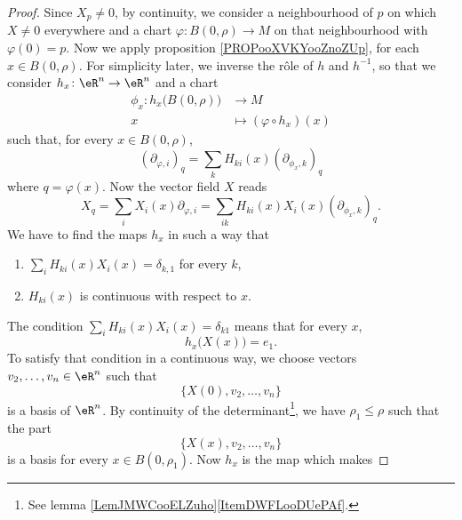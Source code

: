 \begin{proof}
	Since \( X_p\neq 0\), by continuity, we consider a neighbourhood of \( p\) on which \( X\neq 0\) everywhere and a chart \(\varphi \colon B(0,\rho)\to M  \) on that neighbourhood with \( \varphi(0)=p\). Now we apply proposition \ref{PROPooXVKYooZnoZUp}, for each \( x\in B(0,\rho)\). For simplicity later, we inverse the rôle of \( h\) and \( h^{-1}\), so that we consider \(h_x \colon \eR^n\to \eR^n  \) and a chart
	\begin{equation}
		\begin{aligned}
			\phi_x\colon h_x\big( B(0,\rho) \big) & \to M                         \\
			x                                     & \mapsto (\varphi\circ h_x)(x)
		\end{aligned}
	\end{equation}
	such that, for every \( x\in B(0,\rho)\),
	\begin{equation}
		(\partial_{\varphi, i})_q=\sum_kH_{ki}(x)(\partial_{\phi_x,k})_q
	\end{equation}
	where \( q=\varphi(x)\). Now the vector field \( X\) reads
	\begin{equation}
		X_q=\sum_iX_i(x)\partial_{\varphi,i}=\sum_{ik}H_{ki}(x)X_i(x)(\partial_{\phi_x,k})_q.
	\end{equation}
	We have to find the maps \( h_x\) in such a way that
	\begin{enumerate}
		\item
		      \( \sum_{i}H_{ki}(x)X_i(x)=\delta_{k,1}\) for every \( k\),
		\item
		      \( H_{ki}(x)\) is continuous with respect to \( x\).
	\end{enumerate}
	The condition \( \sum_iH_{ki}(x)X_i(x)=\delta_{k1}\) means that for every \( x\),
	\begin{equation}
		h_x\big( X(x) \big)=e_1.
	\end{equation}
	To satisfy that condition in a continuous way, we choose vectors \( v_2,\ldots,v_n\in \eR^n\) such that
	\begin{equation}
		\{ X(0), v_2,\ldots,v_n \}
	\end{equation}
	is a basis of \( \eR^n\). By continuity of the determinant\footnote{See lemma \ref{LemJMWCooELZuho}\ref{ItemDWFLooDUePAf}.}, we have \( \rho_1\leq \rho\) such that the part
	\begin{equation}
		\{ X(x), v_2,\ldots,v_n \}
	\end{equation}
	is a basis for every \( x\in B(0,\rho_1)\). Now \( h_x\) is the map which makes

\end{proof}
